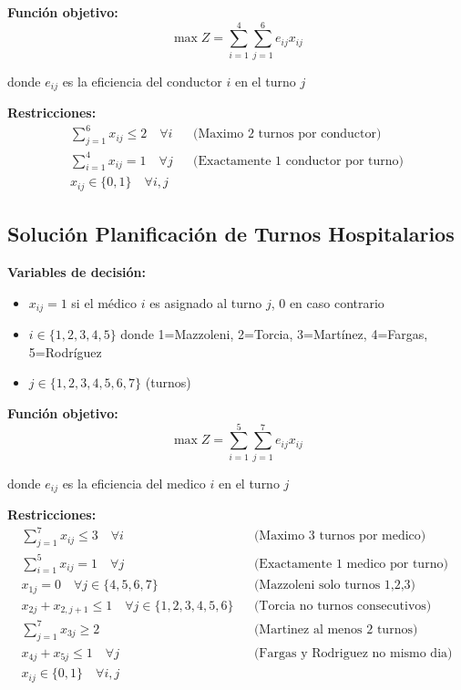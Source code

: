 \documentclass[12pt]{article}
\begin{document}
\textbf{Función objetivo:}
$$\max Z = \sum_{i=1}^{4} \sum_{j=1}^{6} e_{ij} x_{ij}$$
\begin{center}
donde $e_{ij}$ es la eficiencia del conductor $i$ en el turno $j$
\end{center}

\textbf{Restricciones:}
\begin{align*}
    \sum_{j=1}^{6} x_{ij} \leq 2 \quad \forall i && \text{(Maximo 2 turnos por conductor)} \\
    \sum_{i=1}^{4} x_{ij} = 1 \quad \forall j && \text{(Exactamente 1 conductor por turno)} \\
    x_{ij} \in \{0,1\} \quad \forall i,j
\end{align*}

\subsection{Solución Planificación de Turnos Hospitalarios}

\textbf{Variables de decisión:}
\begin{itemize}
    \item $x_{ij} = 1$ si el médico $i$ es asignado al turno $j$, 0 en caso contrario
    \item $i \in \{1, 2, 3, 4, 5\}$ donde 1=Mazzoleni, 2=Torcia, 3=Martínez, 4=Fargas, 5=Rodríguez
    \item $j \in \{1, 2, 3, 4, 5, 6, 7\}$ (turnos)
\end{itemize}

\textbf{Función objetivo:}
$$\max Z = \sum_{i=1}^{5} \sum_{j=1}^{7} e_{ij} x_{ij}$$
\begin{center}
donde $e_{ij}$ es la eficiencia del medico $i$ en el turno $j$
\end{center}

\textbf{Restricciones:}
\begin{align*}
    \sum_{j=1}^{7} x_{ij} \leq 3 \quad \forall i && \text{(Maximo 3 turnos por medico)} \\
    \sum_{i=1}^{5} x_{ij} = 1 \quad \forall j && \text{(Exactamente 1 medico por turno)} \\
    x_{1j} = 0 \quad \forall j \in \{4,5,6,7\} && \text{(Mazzoleni solo turnos 1,2,3)} \\
    x_{2j} + x_{2,j+1} \leq 1 \quad \forall j \in \{1,2,3,4,5,6\} && \text{(Torcia no turnos consecutivos)} \\
    \sum_{j=1}^{7} x_{3j} \geq 2 && \text{(Martinez al menos 2 turnos)} \\
    x_{4j} + x_{5j} \leq 1 \quad \forall j && \text{(Fargas y Rodriguez no mismo dia)} \\
    x_{ij} \in \{0,1\} \quad \forall i,j
\end{align*}
\end{document}
